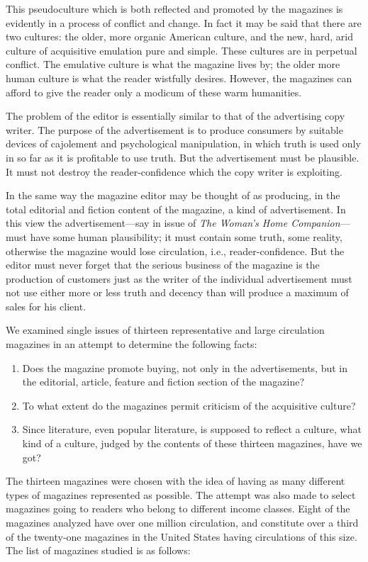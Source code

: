 \documentclass[twoside,nohyper,openany,nobib]{tufte-book}
\begin{document}
This pseudoculture which is both reflected and promoted by the magazines
is evidently in a process of conflict and change. In fact it may be said
that there are two cultures: the older, more organic American culture,
and the new, hard, arid culture of acquisitive emulation pure and
simple. These cultures are in perpetual conflict. The emulative culture
is what the magazine lives by; the older more human culture is what the
reader wistfully desires. However, the magazines can afford to give the
reader only a modicum of these warm humanities.

The problem of the editor is essentially similar to that of the
advertising copy writer. The purpose of the advertisement is to produce
consumers by suitable devices of cajolement and psychological
manipulation, in which truth is used only in so far as it is profitable
to use truth. But the advertisement must be plausible. It must not
destroy the reader-confidence which the copy writer is exploiting.

In the same way the magazine editor may be thought of as producing, in
the total editorial and fiction content of the magazine, a kind of
advertisement. In this view the advertisement---say in issue of
\emph{The Woman's Home Companion}---must have some human plausibility;
it must contain some truth, some reality, otherwise the magazine would
lose circulation, i.e., reader-confidence. But the editor must never
forget that the serious business of the magazine is the production of
customers just as the writer of the individual advertisement must not
use either more or less truth and decency than will produce a maximum of
sales for his client.

We examined single issues of thirteen representative and large
circulation magazines in an attempt to determine the following facts:

\begin{enumerate}
\item
  Does the magazine promote buying, not only in the advertisements, but
  in the editorial, article, feature and fiction section of the
  magazine?
\item
  To what extent do the magazines permit criticism of the acquisitive
  culture?
\item
  Since literature, even popular literature, is supposed to reflect a
  culture, what kind of a culture, judged by the contents of these
  thirteen magazines, have we got?
\end{enumerate}

The thirteen magazines were chosen with the idea of having as many
different types of magazines represented as possible. The attempt was
also made to select magazines going to readers who belong to different
income classes. Eight of the magazines analyzed have over one million
circulation, and constitute over a third of the twenty-one magazines in
the United States having circulations of this size. The list of
magazines studied is as follows:
\end{document}
